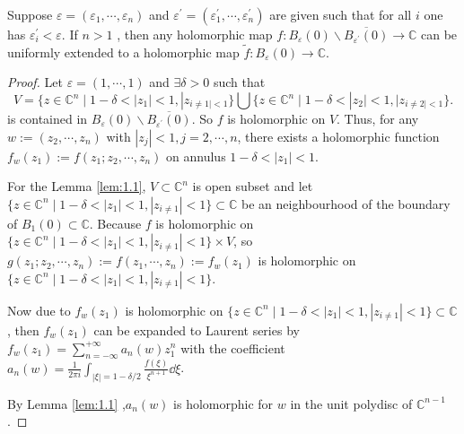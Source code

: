 \begin{theorem}
    Suppose $\varepsilon=(\varepsilon_1,\cdots,\varepsilon_n) $ and $\varepsilon^\prime=(\varepsilon_1^\prime,\cdots,\varepsilon_n^\prime)$ are given such that for all $i$ one has $\varepsilon_i^\prime <\varepsilon$. If $n>1$ , then any holomorphic map $f\colon B_\varepsilon (0)\backslash \overline{B_{\varepsilon^\prime}(0)}\to \mathbb{C}$ can be uniformly extended to a holomorphic map $\widetilde{f}: B_\varepsilon(0)\to \mathbb{C}$.
\end{theorem}
\begin{proof}
    Let $\varepsilon=(1,\cdots,1) $ and $\exists\delta>0$ such that 
    \[V=\{z\in \mathbb{C}^n\mid 1-\delta<|z_1|<1,|z_{i\neq 1|<1}\}\bigcup \{z\in \mathbb{C}^n\mid 1-\delta<|z_2|<1,|z_{i\neq 2|<1}\}.\]
    is contained in $B_\varepsilon(0)\backslash\overline{B_{\varepsilon^\prime}(0)}$. So $f$ is holomorphic on $V$. Thus, for any $w := (z_2,\cdots,z_n)$ with $|z_j|<1,j=2,\cdots,n$, there exists a holomorphic function $f_w(z_1):=f(z_1;z_2,\cdots,z_n)$ on annulus $1-\delta<|z_1|<1$. 
    \begin{remark}
        For the Lemma \ref{lem:1.1}, $V\subset \mathbb{C}^n$ is open subset and let $\{z\in\mathbb{C}^n\mid 1-\delta<|z_1|<1,|z_{i\neq 1}|<1\}\subset \mathbb{C}$ be an neighbourhood of the boundary of $B_1(0)\subset \mathbb{C}$. Because $f$ is holomorphic on $\{z\in\mathbb{C}^n\mid 1-\delta<|z_1|<1,|z_{i\neq 1}|<1\}\times V$, so $g(z_1;z_2,\cdots,z_n):=f(z_1,\cdots,z_n):=f_w(z_1)$ is holomorphic on $\{z\in\mathbb{C}^n\mid 1-\delta<|z_1|<1,|z_{i\neq 1}|<1\}$. 
    \end{remark}
    Now due to $f_w(z_1)$ is holomorphic on $\{z\in\mathbb{C}^n\mid 1-\delta<|z_1|<1,|z_{i\neq 1}|<1\}\subset \mathbb{C}$, then $f_w(z_1)$ can be expanded to Laurent series by $f_w(z_1)=\sum_{n=-\infty}^{+\infty}a_n (w) z_1 ^n$ with the coefficient $a_n (w)=\frac{1}{2\pi i}\int_{|\xi|=1-\delta/2}\frac{f(\xi)}{\xi^{n+1}}\dd \xi$. 

    By Lemma \ref{lem:1.1} ,$a_n (w)$ is holomorphic for $w$ in the unit polydisc of $\mathbb{C}^{n-1}$.


\end{proof}

